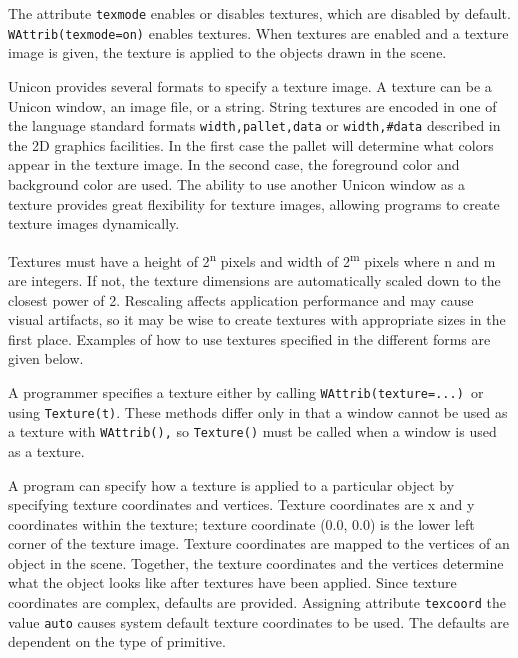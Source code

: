 The attribute \texttt{texmode} enables or disables textures,
which are disabled by default.
\texttt{WAttrib({\textquotedbl}texmode=on{\textquotedbl})} enables textures.
When textures are enabled and a texture image is given, the texture
is applied to the objects drawn in the scene.

Unicon provides several formats to specify a texture image. A texture
can be a Unicon window, an image file, or a string. String textures
are encoded in one of the language standard
formats \texttt{{\textquotedbl}width,pallet,data{\textquotedbl}} or
\texttt{{\textquotedbl}width,\#data{\textquotedbl}} described in the 2D graphics
facilities. In the first case the pallet will determine what colors
appear in the texture image. In the second case, the foreground color
and background color are used. The ability to use another Unicon
window as a texture provides great flexibility for texture images,
allowing programs to create texture images dynamically.

Textures must have a height of 2\textsuperscript{n} pixels and width
of 2\textsuperscript{m} pixels where n and m are integers. If not, the
texture dimensions are automatically scaled down to the closest power
of 2. Rescaling affects application performance and may cause visual
artifacts, so it may be wise to create textures with appropriate sizes
in the first place. Examples of how to use textures specified in the
different forms are given below.

A programmer specifies a texture either by calling
\texttt{WAttrib({\textquotedbl}texture=...{\textquotedbl})}\texttt{ }or
using \texttt{Texture(t)}. These methods differ only in that a
window cannot be used as a texture with \texttt{WAttrib(),} so
\texttt{Texture()} must be called when a window is used as a texture.

A program can specify how a texture is applied to a particular object
by specifying texture coordinates and vertices. Texture
coordinates are x and y coordinates within the texture; texture
coordinate (0.0, 0.0) is the lower left corner of the
texture image. Texture coordinates are mapped to the vertices of an
object in the scene. Together, the texture coordinates and the vertices
determine what the object looks like after textures have been applied.
Since texture coordinates are complex, defaults are provided. Assigning
attribute \texttt{texcoord} the value \texttt{auto} causes system
default texture coordinates to be used. The defaults are dependent on
the type of primitive.

